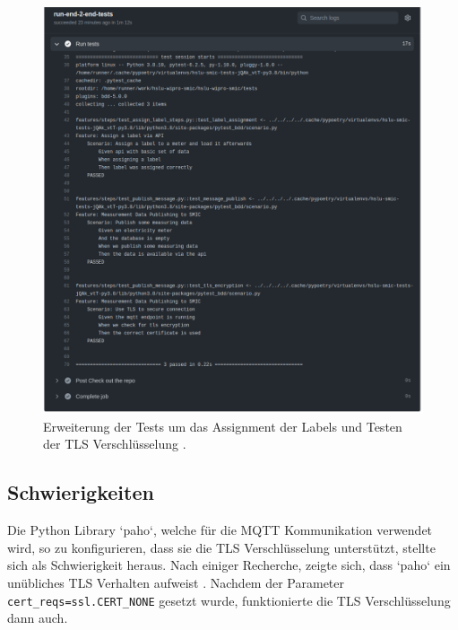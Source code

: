 \begin{figure}[H]
    \centering
    \includegraphics[width=1.0\textwidth]{gfx/testlog-iteration-2}
    \caption{
        Erweiterung der Tests um das Assignment der Labels und Testen der \ac{TLS} Verschlüsselung \parencite{randombenj_testlog_it_2_2021}.
    }
    \label{fig:test-iteration-3}
\end{figure}

\subsection{Schwierigkeiten}
Die Python Library `paho`, welche für die \ac{MQTT} Kommunikation verwendet wird, so zu konfigurieren,
dass sie die \ac{TLS} Verschlüsselung unterstützt, stellte sich als Schwierigkeit heraus.
Nach einiger Recherche, zeigte sich, dass `paho` ein unübliches \ac{TLS}
Verhalten aufweist \parencite{eclipse_paho_ssl_2019}.
Nachdem der Parameter \texttt{cert\_reqs=ssl.CERT\_NONE} gesetzt wurde, funktionierte
die \ac{TLS} Verschlüsselung dann auch.